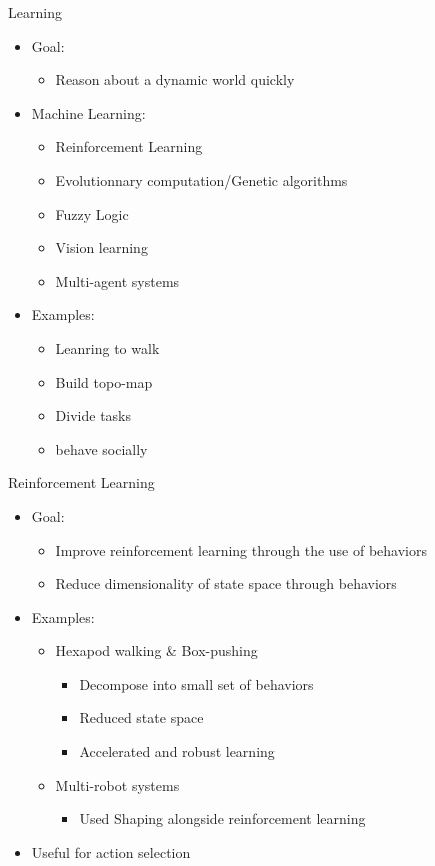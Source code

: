 \documentclass{beamer}
\begin{document}
\begin{frame}{Learning}
  \begin{itemize}
    \item Goal:
    \begin{itemize}
      \item Reason about a dynamic world quickly
    \end{itemize}
    \item Machine Learning:
    \begin{itemize}
      \item Reinforcement Learning
      \item Evolutionnary computation/Genetic algorithms
      \item Fuzzy Logic
      \item Vision learning
      \item Multi-agent systems
    \end{itemize}
    \item Examples:
    \begin{itemize}
      \item Leanring to walk
      \item Build topo-map
      \item Divide tasks
      \item behave socially
    \end{itemize}
  \end{itemize}
\end{frame}

\begin{frame}{Reinforcement Learning}
  \begin{itemize}  
    \item Goal:
    \begin{itemize}
      \item Improve reinforcement learning through the use of behaviors
      \item Reduce dimensionality of state space through behaviors
    \end{itemize}
    \item Examples:
    \begin{itemize}
      \item Hexapod walking \& Box-pushing
      \begin{itemize}
        \item Decompose into small set of behaviors
        \item Reduced state space
        \item Accelerated and robust learning
      \end{itemize}
      \item Multi-robot systems
      \begin{itemize}
        \item Used Shaping alongside reinforcement learning
      \end{itemize}
    \end{itemize}
    \item Useful for action selection
  \end{itemize}
\end{frame}
\end{document}
